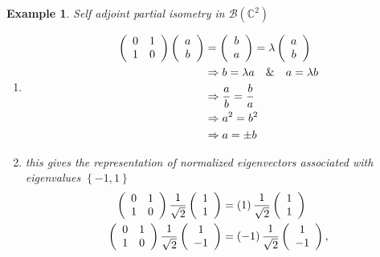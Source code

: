 \documentclass[aps,preprint]{revtex4}%
\newtheorem{example}[theorem]{Example}
\begin{document}
\begin{example}
\emph{Self adjoint} partial isometry in $\mathcal{B}\left(  \mathbb{C}%
^{2}\right)  $

\begin{enumerate}
\item
\begin{align}
\left(
\begin{array}
[c]{cc}%
0 & 1\\
1 & 0
\end{array}
\right)  \left(
\begin{array}
[c]{c}%
a\\
b
\end{array}
\right)   &  =\left(
\begin{array}
[c]{c}%
b\\
a
\end{array}
\right)  =\lambda\left(
\begin{array}
[c]{c}%
a\\
b
\end{array}
\right) \\
&  \Rightarrow b=\lambda a\quad\&\quad a=\lambda b\\
&  \Rightarrow\frac{a}{b}=\frac{b}{a}\\
&  \Rightarrow a^{2}=b^{2}\\
&  \Rightarrow a=\pm b
\end{align}


\item this gives the representation of normalized eigenvectors associated with
eigenvalues $\left\{  -1,1\right\}  $%
\begin{align}
\left(
\begin{array}
[c]{cc}%
0 & 1\\
1 & 0
\end{array}
\right)  \frac{1}{\sqrt{2}}\left(
\begin{array}
[c]{c}%
1\\
1
\end{array}
\right)   &  =\left(  1\right)  \frac{1}{\sqrt{2}}\left(
\begin{array}
[c]{c}%
1\\
1
\end{array}
\right) \\
\left(
\begin{array}
[c]{cc}%
0 & 1\\
1 & 0
\end{array}
\right)  \frac{1}{\sqrt{2}}\left(
\begin{array}
[c]{c}%
1\\
-1
\end{array}
\right)   &  =\left(  -1\right)  \frac{1}{\sqrt{2}}\left(
\begin{array}
[c]{c}%
1\\
-1
\end{array}
\right)  ,
\end{align}



\end{enumerate}
\end{example}
\end{document}
